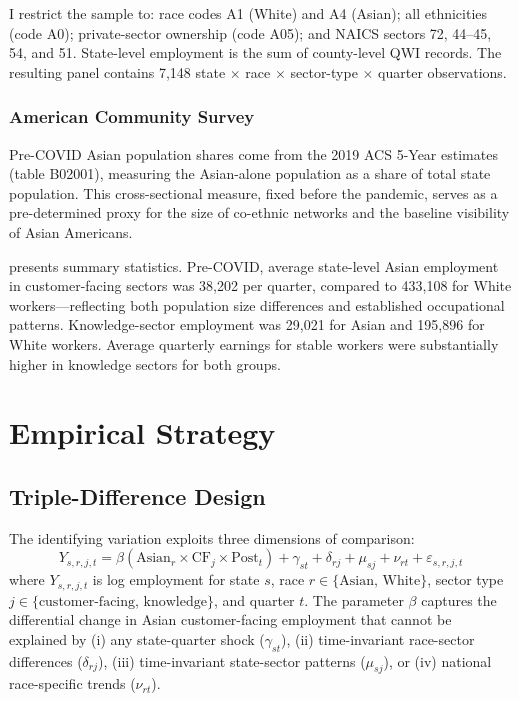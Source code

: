 \documentclass[12pt]{article}
\begin{document}
I restrict the sample to: race codes A1 (White) and A4 (Asian); all ethnicities (code A0); private-sector ownership (code A05); and NAICS sectors 72, 44--45, 54, and 51. State-level employment is the sum of county-level QWI records. The resulting panel contains 7,148 state $\times$ race $\times$ sector-type $\times$ quarter observations.

\subsubsection*{American Community Survey} Pre-COVID Asian population shares come from the 2019 ACS 5-Year estimates (table B02001), measuring the Asian-alone population as a share of total state population. This cross-sectional measure, fixed before the pandemic, serves as a pre-determined proxy for the size of co-ethnic networks and the baseline visibility of Asian Americans.



 presents summary statistics. Pre-COVID, average state-level Asian employment in customer-facing sectors was 38,202 per quarter, compared to 433,108 for White workers---reflecting both population size differences and established occupational patterns. Knowledge-sector employment was 29,021 for Asian and 195,896 for White workers. Average quarterly earnings for stable workers were substantially higher in knowledge sectors for both groups.

\section{Empirical Strategy}

\subsection{Triple-Difference Design}

The identifying variation exploits three dimensions of comparison:
\begin{equation}
Y_{s,r,j,t} = \beta (\text{Asian}_r \times \text{CF}_j \times \text{Post}_t) + \gamma_{st} + \delta_{rj} + \mu_{sj} + \nu_{rt} + \varepsilon_{s,r,j,t}
\label{eq:ddd}
\end{equation}
where $Y_{s,r,j,t}$ is log employment for state $s$, race $r \in \{\text{Asian, White}\}$, sector type $j \in \{\text{customer-facing, knowledge}\}$, and quarter $t$. The parameter $\beta$ captures the differential change in Asian customer-facing employment that cannot be explained by (i) any state-quarter shock ($\gamma_{st}$), (ii) time-invariant race-sector differences ($\delta_{rj}$), (iii) time-invariant state-sector patterns ($\mu_{sj}$), or (iv) national race-specific trends ($\nu_{rt}$).
\end{document}
